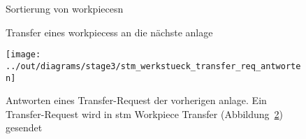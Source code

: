 \begin{figure}
    \caption{Sortierung von \glspl{workpiece}n}
    \label{fig:stm_werkstueck_sortieren}
\end{figure}

\begin{figure}
    \caption{Transfer eines \glspl{workpiece}s an die nächste \gls{anlage}}
    \label{fig:stm_werkstueck_transfer}
\end{figure}

\begin{figure}
    \centering
    \texttt{[image: ../out/diagrams/stage3/stm\_werkstueck\_transfer\_req\_antworten]}
    \caption{Antworten eines Transfer-Request der vorherigen \gls{anlage}.
    Ein Transfer-Request wird in stm Workpiece Transfer (Abbildung~\ref{fig:stm_werkstueck_transfer}) gesendet}
    \label{fig:stm_werkstueck_transfer_req_antworten}
\end{figure}



